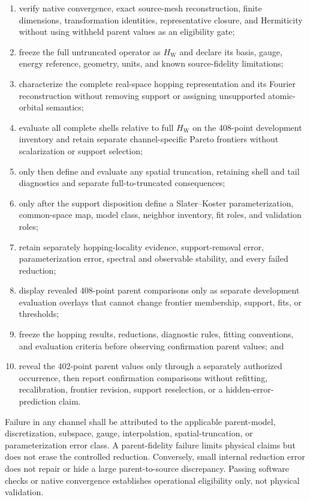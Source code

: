 \documentclass[11pt]{report}
\begin{document}
\begin{enumerate}
  \item verify native convergence, exact source-mesh reconstruction, finite dimensions,
    transformation identities, representative closure, and Hermiticity without using
    withheld parent values as an eligibility gate;
  \item freeze the full untruncated operator as $H_{\mathrm{W}}$ and declare its basis,
    gauge, energy reference, geometry, units, and known source-fidelity limitations;
  \item characterize the complete real-space hopping representation and its Fourier
    reconstruction without removing support or assigning unsupported atomic-orbital
    semantics;
  \item evaluate all complete shells relative to full $H_{\mathrm{W}}$ on the 408-point
    development inventory and retain separate channel-specific Pareto frontiers without
    scalarization or support selection;
  \item only then define and evaluate any spatial truncation, retaining shell and tail
    diagnostics and separate full-to-truncated consequences;
  \item only after the support disposition define a Slater--Koster parameterization,
    common-space map, model class, neighbor inventory, fit roles, and validation roles;
  \item retain separately hopping-locality evidence, support-removal error,
    parameterization error, spectral and observable stability, and every failed
    reduction;
  \item display revealed 408-point parent comparisons only as separate development
    evaluation overlays that cannot change frontier membership, support, fits, or
    thresholds;
  \item freeze the hopping results, reductions, diagnostic rules, fitting conventions,
    and evaluation criteria before observing confirmation parent values; and
  \item reveal the 402-point parent values only through a separately authorized
    occurrence, then report confirmation comparisons without refitting, recalibration,
    frontier revision, support reselection, or a hidden-error-prediction claim.
\end{enumerate}

Failure in any channel shall be attributed to the applicable parent-model,
discretization, subspace, gauge, interpolation, spatial-truncation, or parameterization
error class.  A parent-fidelity failure limits physical claims but does not erase the
controlled reduction.  Conversely, small internal reduction error does not repair or
hide a large parent-to-source discrepancy.  Passing software checks or native
convergence establishes operational eligibility only, not physical validation.
\end{document}
